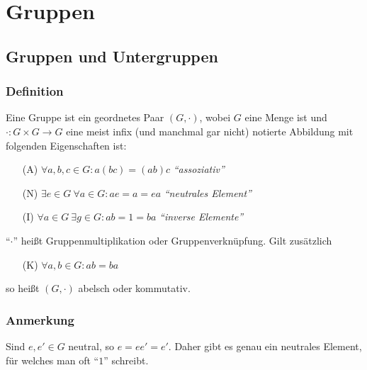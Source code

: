 \chapter{Gruppen}

\section{Gruppen und Untergruppen}

\subsection{Definition} Eine Gruppe ist ein geordnetes Paar $(G, \cdot)$, wobei $G$ eine Menge ist und $\cdot : G \times G \to G$ eine meist infix (und manchmal gar nicht) notierte Abbildung mit folgenden Eigenschaften ist:
	\begin{itemize}
		\item[(A)]
			$\forall a, b, c \in G : a(bc) = (ab)c$ \quad\quad \textit{"`assoziativ"'}
		\item[(N)]
			$\exists e \in G ~\forall a \in G : ae = a = ea$ \quad\quad \textit{"`neutrales Element"'}
		\item[(I)]
			$\forall a \in G ~\exists g \in G : ab = 1 = ba$ \quad\quad \textit{"`inverse Elemente"'}
	\end{itemize}
"`$\cdot$"' heißt Gruppenmultiplikation oder Gruppenverknüpfung. Gilt zusätzlich
	\begin{itemize}
		\item[(K)] $\forall a,b \in G : ab = ba$
	\end{itemize}
so heißt $(G, \cdot)$ abelsch oder kommutativ.

\subsection*{Anmerkung} Sind $e, e' \in G$ neutral, so $e = ee' = e'$. Daher gibt es genau ein neutrales Element, für welches man oft "`$1$"' schreibt.

